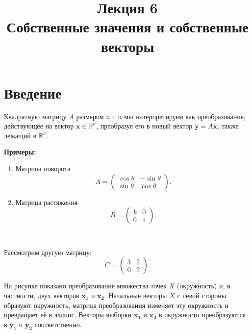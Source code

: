 \documentclass[11pt,a4paper]{article}
\title{Лекция 6 \\
    Собственные значения и собственные векторы
    }
\providecommand{\tightlist}{%
      \setlength{\itemsep}{0pt}\setlength{\parskip}{0pt}}
\begin{document}
    
    \maketitle


    \hypertarget{ux432ux432ux435ux434ux435ux43dux438ux435}{%
\section{Введение}\label{ux432ux432ux435ux434ux435ux43dux438ux435}}

Квадратную матрицу \(A\) размером \(n \times n\) мы интерпретируем как
преобразование, действующее на вектор \(\mathbf{x} \in \mathbb{R}^n\),
преобразуя его в новый вектор \(\mathbf{y} = A\mathbf{x}\), также
лежащий в \(\mathbb{R}^n\).

\textbf{Примеры:}

\begin{enumerate}
\def\labelenumi{\arabic{enumi}.}
\tightlist
\item
  Матрица поворота \[
  A = 
  \begin{pmatrix}
    \cos{\theta} & -\sin{\theta} \\
    \sin{\theta} &  \cos{\theta}
  \end{pmatrix}.
\]

\item
  Матрица растяжения \[
    B = 
    \begin{pmatrix}
   k & 0 \\
   0 & 1
    \end{pmatrix}.
  \]
\end{enumerate}

    \begin{center}
    \end{center}
    { \hspace*{\fill} \\}
    
    Рассмотрим другую матрицу: \[
  C = 
  \begin{pmatrix}
    3 & 2 \\
    0 & 2
  \end{pmatrix}.
\]

На рисунке показано преобразование множества точек \(X\) (окружность) и,
в частности, двух векторов \(\mathbf{x_1}\) и \(\mathbf{x_2}\).
Начальные векторы \(X\) с левой стороны образуют окружность, матрица
преобразования изменяет эту окружность и превращает её в эллипс. Векторы
выборки \(\mathbf{x_1}\) и \(\mathbf{x_2}\) в окружности преобразуются в
\(\mathbf{y_1}\) и \(\mathbf{y_2}\) соответственно.
\end{document}
